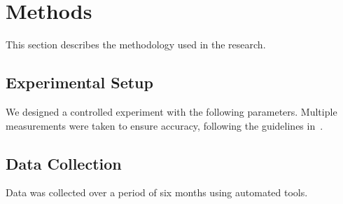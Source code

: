 \section{Methods}
This section describes the methodology used in the research.

\subsection{Experimental Setup}
We designed a controlled experiment with the following parameters.
Multiple measurements were taken to ensure accuracy, following the guidelines in~\cite{example2022}.

\subsection{Data Collection}
Data was collected over a period of six months using automated tools.
